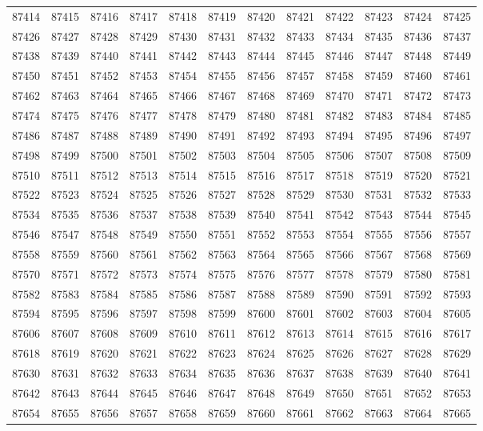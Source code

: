 \begin{center}
\begin{longtable}{llllllllllll}
87414 &87415 &87416 &87417 &87418 &87419 &87420 &87421 &87422 &87423 &87424 &87425 \\
87426 &87427 &87428 &87429 &87430 &87431 &87432 &87433 &87434 &87435 &87436 &87437 \\
87438 &87439 &87440 &87441 &87442 &87443 &87444 &87445 &87446 &87447 &87448 &87449 \\
87450 &87451 &87452 &87453 &87454 &87455 &87456 &87457 &87458 &87459 &87460 &87461 \\
87462 &87463 &87464 &87465 &87466 &87467 &87468 &87469 &87470 &87471 &87472 &87473 \\
87474 &87475 &87476 &87477 &87478 &87479 &87480 &87481 &87482 &87483 &87484 &87485 \\
87486 &87487 &87488 &87489 &87490 &87491 &87492 &87493 &87494 &87495 &87496 &87497 \\
87498 &87499 &87500 &87501 &87502 &87503 &87504 &87505 &87506 &87507 &87508 &87509 \\
87510 &87511 &87512 &87513 &87514 &87515 &87516 &87517 &87518 &87519 &87520 &87521 \\
87522 &87523 &87524 &87525 &87526 &87527 &87528 &87529 &87530 &87531 &87532 &87533 \\
87534 &87535 &87536 &87537 &87538 &87539 &87540 &87541 &87542 &87543 &87544 &87545 \\
87546 &87547 &87548 &87549 &87550 &87551 &87552 &87553 &87554 &87555 &87556 &87557 \\
87558 &87559 &87560 &87561 &87562 &87563 &87564 &87565 &87566 &87567 &87568 &87569 \\
87570 &87571 &87572 &87573 &87574 &87575 &87576 &87577 &87578 &87579 &87580 &87581 \\
87582 &87583 &87584 &87585 &87586 &87587 &87588 &87589 &87590 &87591 &87592 &87593 \\
87594 &87595 &87596 &87597 &87598 &87599 &87600 &87601 &87602 &87603 &87604 &87605 \\
87606 &87607 &87608 &87609 &87610 &87611 &87612 &87613 &87614 &87615 &87616 &87617 \\
87618 &87619 &87620 &87621 &87622 &87623 &87624 &87625 &87626 &87627 &87628 &87629 \\
87630 &87631 &87632 &87633 &87634 &87635 &87636 &87637 &87638 &87639 &87640 &87641 \\
87642 &87643 &87644 &87645 &87646 &87647 &87648 &87649 &87650 &87651 &87652 &87653 \\
87654 &87655 &87656 &87657 &87658 &87659 &87660 &87661 &87662 &87663 &87664 &87665 \\

\end{longtable}
\end{center}
